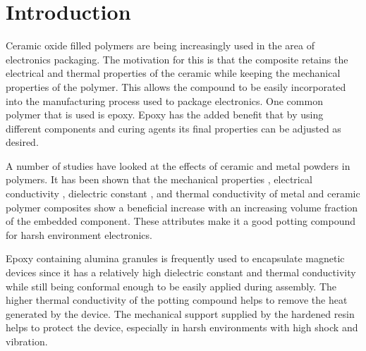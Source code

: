 \chapter{Introduction}

Ceramic oxide filled polymers are being increasingly used in the area of electronics packaging.  The motivation for this is that the composite retains the electrical and thermal properties of the ceramic while keeping the mechanical properties of the polymer.  This allows the compound to be easily incorporated into the manufacturing process used to package electronics.  One common polymer that is used is epoxy.  Epoxy has the added benefit that by using different components and curing agents its final properties can be adjusted as desired.  

A number of studies have looked at the effects of ceramic and metal powders in polymers.  It has been shown that the mechanical properties \cite{McGrath2008, Wong1999}, electrical conductivity \cite{Mamunya2002}, dielectric constant \cite{Singh2003}, and thermal conductivity \cite{Wong1999, Mamunya:2002} of metal and ceramic polymer composites show a beneficial increase with an increasing volume fraction of the embedded component.  These attributes make it a good potting compound for harsh environment electronics.

Epoxy containing alumina granules is frequently used to encapsulate magnetic devices since it has a relatively high dielectric constant and thermal conductivity while still being conformal enough to be easily applied during assembly.  The higher thermal conductivity of the potting compound helps to remove the heat generated by the device.  The mechanical support supplied by the hardened resin helps to protect the device, especially in harsh environments with high shock and vibration.

